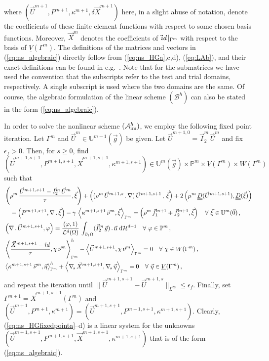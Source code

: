 \documentclass[a4paper,12pt,onecolumn]{article}
\newcommand{\vol}{\mathcal{L}^d}
\newcommand{\dH}[1]{\;{\rm d}{\cal H}^{#1}} %
\newcommand{\Vh}{\underline{V}(\Gamma^m)}
\newcommand{\Wh}{W(\Gamma^m)}
\newcommand{\uspacedisc}[2]{\mathbb{U}^{#2}(\vec{#1})}
\newcommand{\pspace}{\mathbb{P}}
\newcommand{\nabs}{\nabla_{\!s}}
\newcommand{\id}{\rm id}
\newcommand{\unitn}{\vec{\rm n}}
\newcommand{\mat}[1]{\underline{\underline{#1}}\rule{0pt}{0pt}}
\newcommand{\schemeAim}{{\mathcal{A}^h_{\rm im}}}
\newcommand{\schemeB}{{\mathcal{B}^h}}
\begin{document}
where $(\vec U^{m+1},P^{m+1},\kappa^{m+1},\delta\vec X^{m+1})$ here,
in a slight abuse of notation, denote the
coefficients of these finite element functions with respect to some chosen
basis functions.
Moreover, $\vec X^m$ denotes the coefficients of
$\vec\id\!\mid_{\Gamma^m}$ with respect to the basis of $\Vh$. The definitions
of the matrices and vectors in (\ref{eq:ns_algebraic}) directly follow from
(\ref{eq:ns_HGa},c,d), (\ref{eq:LAb}),
and their exact definitions can be found in e.g.\ \cite[\S5.5]{Agnese}.
Note that
for the submatrices we have used the convention that the subscripts refer to
the test and trial domains, respectively. A single subscript is used where the
two domains are the same.
Of course, the algebraic formulation of the linear scheme
$(\schemeB)$ can also be stated in the form (\ref{eq:ns_algebraic}).

In order to solve the nonlinear scheme $(\schemeAim)$,
we employ the following fixed point iteration.
Let $\Gamma^m$ and $\vec U^m\in \uspacedisc{g}{m-1}$ be given.
Let $\vec U^{m+1,0}=\vec I^m_2\,\vec U^m$ and fix $\epsilon_f > 0$.
Then, for $s \geq 0$,
find $(\vec U^{m+1,s+1},P^{m+1,s+1}, \vec X^{m+1,s+1}, \kappa^{m+1,s+1}) \in
\uspacedisc{g}{m}\times \pspace^m \times \Vh \times \Wh$ such that
\begin{subequations}
\begin{align}
& \left( \rho^m\,\frac{\vec U^{m+1,s+1} - \vec I^m_2\,\vec U^m}{\tau}, \vec
\xi \right) + \left((\rho^m\,\vec U^{m+1,s}\,.\,\nabla)\,\vec U^{m+1,s+1}\,,
\,\vec \xi \right)
+ 2\left(\mu^m\,\mat D(\vec U^{m+1,s+1}), \mat D(\vec \xi) \right)
\nonumber \\ &\quad
- \left(P^{m+1,s+1}, \nabla\,.\,\vec \xi\right)
- \gamma\,\left\langle \kappa^{m+1,s+1}\,\vec\nu^m,\vec\xi\right\rangle_{\Gamma^m}
= \left(\rho^m\,\vec f_1^{m+1}+\vec f_2^{m+1}, \vec \xi\right)
\quad \forall\ \vec\xi \in \uspacedisc{0}{m}\,, \label{eq:ns_HGfixedpointa} \\
& \left(\nabla\,.\,\vec U^{m+1,s+1}, \varphi\right)  =
 \frac{\left(\varphi, 1\right)}{\vol(\Omega)}\, \int_{\partial_1\Omega}
(\vec I^m_2\,\vec g) \,.\, \unitn \dH{d-1}
\quad \forall\ \varphi \in \pspace^m\,,\label{eq:ns_HGfixedpointb} \\
&  \left\langle \frac{\vec X^{m+1,s+1} - \vec\id}{\tau} ,\chi\,\vec\nu^m
\right\rangle_{\Gamma^m}^h - \left\langle \vec U^{m+1,s+1}, \chi\,\vec\nu^m
\right\rangle_{\Gamma^m}  = 0 \quad \forall\ \chi \in \Wh\,,
\label{eq:ns_HGfixedpointc}\\
& \left\langle \kappa^{m+1,s+1}\,\vec\nu^m, \vec\eta \right\rangle_{\Gamma^m}^h
+ \left\langle \nabs\,\vec X^{m+1,s+1}, \nabs\,\vec \eta
\right\rangle_{\Gamma^m} = 0 \quad \forall\ \vec\eta \in \Vh\,,
\label{eq:ns_HGfixedpointd}
\end{align}
\end{subequations}
and repeat the iteration until $\|\vec U^{m+1,s+1}-\vec U^{m+1,s}\|_{L^\infty}
\leq\epsilon_f$. Finally, set $\Gamma^{m+1}=\vec X^{m+1,s+1}(\Gamma^m)$
and $(\vec U^{m+1}, P^{m+1}, \kappa^{m+1}) = (\vec U^{m+1,s+1}, P^{m+1,s+1},
\kappa^{m+1,s+1})$. Clearly, (\ref{eq:ns_HGfixedpointa}--d) is a linear
system for the unknowns $(\vec U^{m+1,s+1}, P^{m+1,s+1},
\vec X^{m+1,s+1}, \kappa^{m+1,s+1})$ that is of the form
(\ref{eq:ns_algebraic}).
\end{document}
